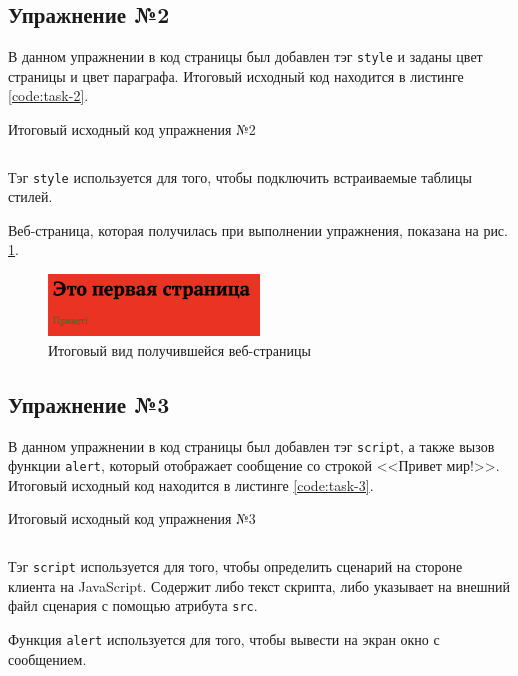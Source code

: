 \documentclass[a4paper, 14pt]{extarticle}
\newenvironment{code}{\captionsetup{type=listing}}{}
\begin{document}
\subsection{Упражнение №2}

В данном упражнении в код страницы был добавлен тэг \texttt{style} и заданы
цвет страницы и цвет параграфа. Итоговый исходный код находится в листинге
\ref{code:task-2}.

\begin{code}
  \caption{Итоговый исходный код упражнения №2}
  \label{code:task-2}
  \inputminted{html}{../task-2/Sample02.html}
\end{code}

Тэг \texttt{style} используется для того, чтобы подключить встраиваемые таблицы
стилей.

Веб-страница, которая получилась при выполнении упражнения, показана на рис.
\ref{fig:task-2}.

\begin{figure}[H]
  \centering
  \includegraphics[width=0.5\textwidth]{images/task-2.png}
  \caption{Итоговый вид получившейся веб-страницы}
  \label{fig:task-2}
\end{figure}

\subsection{Упражнение №3}

В данном упражнении в код страницы был добавлен тэг \texttt{script}, а также
вызов функции \texttt{alert}, который отображает сообщение со строкой <<Привет
мир!>>. Итоговый исходный код находится в листинге \ref{code:task-3}.

\begin{code}
  \caption{Итоговый исходный код упражнения №3}
  \label{code:task-3}
  \inputminted{html}{../task-3/Sample03.html}
\end{code}

Тэг \texttt{script} используется для того, чтобы определить сценарий на стороне
клиента на JavaScript. Содержит либо текст скрипта, либо указывает на внешний
файл сценария с помощью атрибута \texttt{src}.

Функция \texttt{alert} используется для того, чтобы вывести на экран окно с
сообщением.
\end{document}
